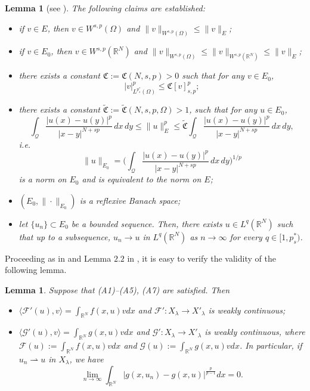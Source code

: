 \documentclass[10pt,a4paper]{amsart}
\numberwithin{equation}{section}
\newtheorem{lemma}[theorem]{Lemma}
\begin{document}
\begin{lemma}[see \cite{r9, r31}] \label{L2.2}
The following claims are established:
\begin{itemize}
\item[(i)] if $v\in E$, then $v\in W^{s,p}(\Omega)$ and $\|v\|_{W^{s,p}(\Omega)}
\leq \|v\|_E$;

\item[(ii)] if $v\in E_0$, then $v\in W^{s,p}(\mathbb{R}^N)$ and 
$\|v\|_{W^{s,p}(\Omega)}\leq \|v\|_{W^{s,p}(\mathbb{R}^N)}\leq\|v\|_E$;

\item[(iii)] there exists a constant $\mathfrak{C}:=\mathfrak{C}(N, s, p)>0$ such that 
for any $v\in E_0$,
$$
|v|_{L^{p^*_s}(\Omega)}^p\leq\mathfrak{C}[v]_{s,p}^p;
$$
\item[(iv)] there exists a constant $\widetilde{\mathfrak{C}}
:=\widetilde{\mathfrak{C}}(N, s, p, \Omega)>1$, such that for any $u\in E_0$,
$$
\int_\mathcal{Q}\frac{|u(x)-u(y)|^p}{|x-y|^{N+sp}}\,dx\,dy
\leq\|u\|_E^p\leq\widetilde{\mathfrak{C}}\int_\mathcal{Q}
\frac{|u(x)-u(y)|^p}{|x-y|^{N+sp}}\,dx\,dy,
$$
i.e.
$$
\|u\|_{E_0}=\Big(\int_\mathcal{Q}\frac{|u(x)-u(y)|^p}{|x-y|^{N+sp}}\,dx\,dy
\Big)^{1/p}$$
is a norm on $E_0$ and is equivalent to the norm on $E$;

\item[(v)] $(E_0, \|\cdot\|_{E_0})$ is a reflexive Banach space;

\item[(vi)] let $\{u_n\}\subset E_0$ be a bounded sequence. 
Then, there exists $u\in L^q(\mathbb{R}^N)$ such that up to a
subsequence, $u_n\to  u$ in $L^q(\mathbb{R}^N)$ as $n\to \infty$ for every 
$q\in[1, p^*_s)$.
\end{itemize}
\end{lemma}

Proceeding as in \cite[Lemma 1]{r30} and Lemma $2.2$ in  \cite{r34}, it is easy to 
verify the validity of the following lemma.

\begin{lemma}\label{L2.3} 
Suppose that {\rm (A1)--(A5), (A7)} are satisfied. Then
\begin{itemize}
\item[(i)] $\langle\mathcal{F}'(u), v\rangle=\int_{\mathbb{R}^N}f(x,u)v dx$ 
and $\mathcal{F}': X_\lambda \to  X'_\lambda$ is weakly continuous;

\item[(ii)] $\langle\mathcal{G}'(u), v\rangle=\int_{\mathbb{R}^N}g(x,u)v dx$ and 
$\mathcal{G}': X_\lambda \to  X'_\lambda$ is weakly continuous, where 
$\mathcal{F}(u):=\int_{\mathbb{R}^N}f(x,u)v dx$ and 
$\mathcal{G}(u):=\int_{\mathbb{R}^N}g(x,u)v dx$. 
In particular, if $u_n\rightharpoonup u$ in $X_\lambda$, we have
$$
\lim_{n\to \infty}\int_{\mathbb{R}^N} |g(x,u_n)-g(x,u)|^{\frac{p}{p-1}}dx=0.
$$
\end{itemize}
\end{lemma}
\end{document}
